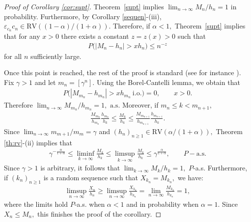 \documentclass[12pt]{amsart}
\begin{document}
\begin{proof}[Proof of Corollary \ref{cor:supt}]
Theorem~\ref{supt} implies $\lim_{n\to\infty} M_n / h_n=1$ in
probability. Furthermore, by Corollary \ref{sequen}-(iii),
${\varepsilon}_{c_{n}} c_n \in \mbox{RV}((1-\alpha)/(1+\alpha)).$ Therefore, if $\alpha<1,$
Theorem~\ref{supt} implies that for any $x>0$ there exists a constant
$z=z(x)>0$ such that \begin{eqnarray*} P\bigl(|M_n-h_n|>xh_n\bigr) \leq n^{-z}
\end{eqnarray*} for all $n$ sufficiently large.
\par
Once this point is reached, the rest of the
proof is standard (see for instance \cite[Section~1.7]{durrett}).
Fix $\gamma>1$ and let $m_n=[\gamma^n].$ Using the Borel-Cantelli lemma, we obtain that \begin{eqnarray*}
P\bigl(|M_{m_n}-h_{m_n}|>xh_{m_n}~\mbox{i.o.}\bigr)=0,\qquad x>0.
\end{eqnarray*}
Therefore $ \lim_{n\to\infty} M_{m_n}/h_{m_n}=1,$ ${\mbox{a.s.}}$ Moreover, if
$m_n\leq k<m_{n+1},$
\begin{eqnarray*}
{\frac {\displaystyle {M_{m_n}}}{\displaystyle {h_{m_n}} }}{\frac {\displaystyle {h_{m_n}}}{\displaystyle {h_k} }} \leq {\frac {\displaystyle {M_k}}{\displaystyle {h_k} }} \leq {\frac {\displaystyle {M_{m_{n+1}}}}{\displaystyle {h_{m_{n+1}}} }}{\frac {\displaystyle {h_{m_{n+1}}}}{\displaystyle {h_k} }}.
\end{eqnarray*}
Since $\lim_{n\to\infty} m_{m+1}/m_m =\gamma$ and $(h_n)_{n\ge 1}\in
\mbox{RV}(\alpha/(1+\alpha)),$ Theorem \ref{th:rv}-(ii) implies that
\begin{eqnarray*}
\gamma^{-\frac{\alpha}{1+\alpha}} \leq \liminf_{k\to\infty} {\frac {\displaystyle {M_k}}{\displaystyle {h_k} }} \leq
\limsup_{k\to\infty} {\frac {\displaystyle {M_k}}{\displaystyle {h_k} }} \leq \gamma^{\frac{\alpha}{1+\alpha}}, \qquad P-\mbox{a.s.}
\end{eqnarray*}
Since $\gamma>1$ is arbitrary, it follows that $\lim_{k\to\infty} M_k /h_k =1,$ $P$-a.s.
Furthermore, if $(k_n)_{n\geq 1}$ is a random sequence such that $X_{k_n} = M_{k_n},$ we have:
\begin{eqnarray*}
\limsup_{n\to\infty} {\frac {\displaystyle {X_n}}{\displaystyle {h_n} }} \geq \limsup_{n\to\infty} \frac{X_{k_n}}{h_{k_n}}=\lim_{n\to\infty}
\frac{M_{k_n}}{h_{k_n}}=1,
\end{eqnarray*}
where the limits hold $P$-a.s. when $\alpha<1$ and in probability when $\alpha=1.$ Since $X_n\leq M_n,$ this
finishes the proof of the corollary.
\end{proof}
\end{document}
